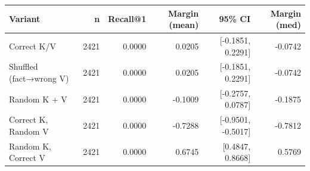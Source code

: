 \begin{tabular}{l r r r r r}
\toprule
Variant & n & Recall@1 & Margin (mean) & 95\% CI & Margin (med) \\  %
\midrule
Correct K/V & 2421 & 0.0000 & 0.0205 & [-0.1851, 0.2291] & -0.0742 \\
Shuffled (fact→wrong V) & 2421 & 0.0000 & 0.0205 & [-0.1851, 0.2291] & -0.0742 \\
Random K + V & 2421 & 0.0000 & -0.1009 & [-0.2757, 0.0787] & -0.1875 \\
Correct K, Random V & 2421 & 0.0000 & -0.7288 & [-0.9501, -0.5017] & -0.7812 \\
Random K, Correct V & 2421 & 0.0000 & 0.6745 & [0.4847, 0.8668] & 0.5769 \\
\bottomrule
\end{tabular}

